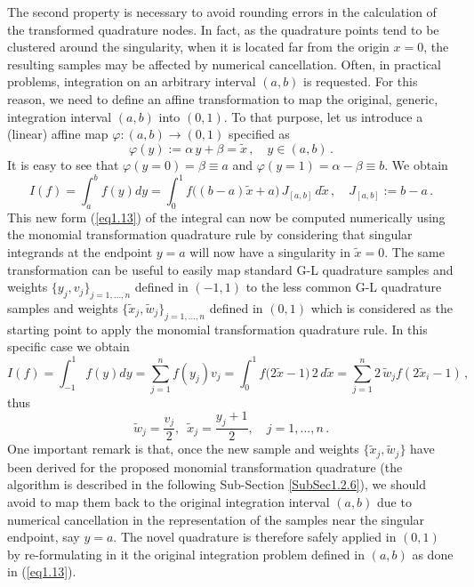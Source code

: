 \documentclass[a4paper, twosided]{book}
\begin{document}
\noindent
The second property is necessary to avoid rounding errors in the calculation of the transformed quadrature nodes. In fact, as the quadrature points tend to be clustered around the singularity, when it is located far from the origin $x=0$, the resulting samples may be affected by numerical cancellation. Often, in practical problems, integration on an arbitrary interval $(a,b)$ is requested. For this reason, we need to define an affine transformation to map the original, generic, integration interval $(a,b)$ into $(0,1)$. To that purpose, let us introduce a (linear) affine map $\varphi:(a,b)\to(0,1)$ specified as
\begin{equation}\label{eq1.12}
    \varphi(y) := \alpha\,y + \beta = \tilde{x}\,,\quad y\in(a,b)\,.
\end{equation}
\noindent
It is easy to see that $\varphi(y=0)=\beta\equiv a$ and $\varphi(y=1)=\alpha-\beta\equiv b$. We obtain
\begin{equation}\label{eq1.13}
    I(f) = \int_a^b f(y) dy = \int_{0}^{1} f\Big(({b-a})\tilde{x}+a\Big)\,J_{[a,b]}\,d\tilde{x}\,,\quad J_{[a,b]}:=b-a\,.
\end{equation}
\noindent
This new form (\ref{eq1.13}) of the integral can now be computed numerically using the monomial transformation quadrature rule by considering that singular integrands at the endpoint $y=a$ will now have a singularity in $\tilde{x}=0$. The same transformation can be useful to easily map standard G-L quadrature samples and weights $\{y_j, v_j\}_{j=1,...,n}$ defined in $(-1,1)$ to the less common G-L quadrature samples and weights $\{\tilde{x}_j,\tilde{w}_j\}_{j=1,...,n}$ defined in $(0,1)$ which is considered as the starting point to apply the monomial transformation quadrature rule. In this specific case we obtain
\begin{equation}\label{eq1.14}
    I(f) = \int_{-1}^1 f(y) dy =\sum_{j=1}^n f(y_j)v_j = \int_{0}^{1} f\Big(2\tilde{x}-1\Big)\,2\, d\tilde{x}=\sum_{j=1}^n 2\,\tilde{w}_j f(2 \tilde{x}_i-1)\,,
\end{equation}
\noindent
thus
\begin{equation}\label{eq1.15}
    \tilde{w}_j=\frac{v_j}{2}, \;\: \tilde{x}_j=\frac{y_j+1}{2}, \quad j=1,...,n\,.
\end{equation}
\noindent
One important remark is that, once the new sample and weights $\{\tilde{x}_j,\tilde{w}_j\}$ have been derived for the proposed monomial transformation quadrature (the algorithm is described in the following Sub-Section \ref{SubSec1.2.6}), we should avoid to map them back to the original integration interval $(a,b)$ due to numerical cancellation in the representation of the samples near the singular endpoint, say $y=a$. The novel quadrature is therefore safely applied in $(0,1)$ by re-formulating in it the original integration problem defined in $(a,b)$ as done in (\ref{eq1.13}).
\end{document}
